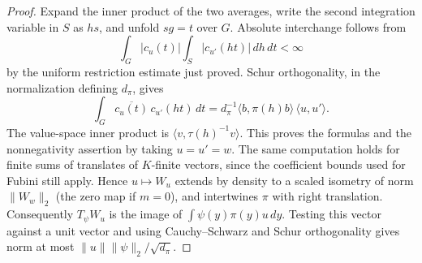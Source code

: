 \documentclass[a4paper,11pt]{article}
\theoremstyle{definition}
\theoremstyle{remark}
\numberwithin{equation}{section}
\begin{document}
\begin{proof}
Expand the inner product of the two averages, write the second
integration variable in \(S\) as \(hs\), and unfold \(sg=t\)
over \(G\). Absolute interchange follows from
\[
 \int_G |c_u(t)|\int_S|c_{u'}(ht)|\,dh\,dt<\infty
\]
by the uniform restriction estimate just proved. Schur
orthogonality, in the normalization defining \(d_\pi\), gives
\[
 \int_G\overline{c_u(t)}\,c_{u'}(ht)\,dt
     = d_\pi^{-1}\langle b,\pi(h)b\rangle\,\langle u,u'\rangle .
\]
The value-space inner product is
\(\langle v,\tau(h)^{-1}v\rangle\). This proves the formulas
and the nonnegativity assertion by taking \(u=u'=w\).
The same computation holds for finite sums of translates of
\(K\)-finite vectors, since the coefficient bounds used for
Fubini still apply. Hence \(u\mapsto W_u\) extends by density
to a scaled isometry of norm \(\|W_w\|_2\) (the zero map if
\(m=0\)), and intertwines \(\pi\) with right translation.
Consequently \(T_\psi W_u\) is the image of
\(\int\psi(y)\pi(y)u\,dy\). Testing this vector against a unit
vector and using Cauchy--Schwarz and Schur orthogonality gives
norm at most \(\|u\|\|\psi\|_2/\sqrt{d_\pi}\).
\end{proof}
\end{document}
